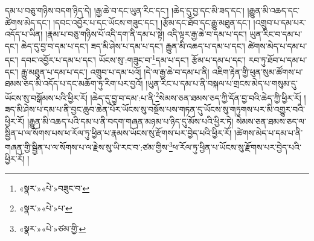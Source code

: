 དམ་པ་བཅུ་གཉིས་བདག་ཉིད་དེ། །རྒྱ་ཆེ་བ་དང་ཡུན་རིང་དང་། །ཆེད་དུ་བྱ་དང་མི་ཟད་དང་། །རྒྱུན་མི་འཆད་དང་ཚེགས་མེད་དང་། །དབང་འབྱོར་པ་དང་ཡོངས་གཟུང་དང་། །རྩོམ་དང་ཐོབ་དང་རྒྱུ་མཐུན་དང་། །འགྲུབ་པ་དམ་པར་འདོད་པ་ཡིན། །རྣམ་པ་བཅུ་གཉིས་པོ་འདི་དག་ནི་དམ་པ་སྟེ། འདི་ལྟར་རྒྱ་ཆེ་བ་དམ་པ་དང་། ཡུན་རིང་བ་དམ་པ་དང་། ཆེད་དུ་བྱ་བ་དམ་པ་དང་། ཟད་མི་ཤེས་པ་དམ་པ་དང་། རྒྱུན་མི་འཆད་པ་དམ་པ་དང་། ཚེགས་མེད་པ་དམ་པ་དང་། དབང་འབྱོར་པ་དམ་པ་དང་། ཡོངས་སུ་:གཟུང་བ་\footnote{«སྣར་»«པེ་»བཟུང་བ་}དམ་པ་དང་། རྩོམ་པ་དམ་པ་དང་། རབ་ཏུ་ཐོབ་པ་དམ་པ་དང་། རྒྱུ་མཐུན་པ་དམ་པ་དང་། འགྲུབ་པ་དམ་པའོ། །དེ་ལ་རྒྱ་ཆེ་བ་དམ་པ་ནི། འཇིག་རྟེན་གྱི་ཕུན་སུམ་ཚོགས་པ་ཐམས་ཅད་མི་འདོད་པ་དང་མཆོག་ཏུ་རིག་པར་བྱའོ། །ཡུན་རིང་པ་དམ་པ་ནི་བསྐལ་པ་གྲངས་མེད་པ་གསུམ་དུ་ཡོངས་སུ་བསྒོམས་པའི་ཕྱིར་རོ། །ཆེད་དུ་བྱ་བ་དམ་:པ་ནི་\footnote{«སྣར་»«པེ་»པ་}སེམས་ཅན་ཐམས་ཅད་ཀྱི་དོན་བྱ་བའི་ཆེད་ཀྱི་ཕྱིར་རོ། །ཟད་མི་ཤེས་པ་དམ་པ་ནི་བྱང་ཆུབ་ཆེན་པོར་ཡོངས་སུ་བསྔོས་པས་གཏན་དུ་ཡོངས་སུ་གཏུགས་པར་མི་འགྱུར་བའི་ཕྱིར་རོ། །རྒྱུན་མི་འཆད་པའི་དམ་པ་ནི་བདག་གཞན་མཉམ་པ་ཉིད་དུ་མོས་པའི་ཕྱིར་ཏེ། སེམས་ཅན་ཐམས་ཅད་ལ་སྦྱིན་པ་ལ་སོགས་པས་ཕ་རོལ་ཏུ་ཕྱིན་པ་རྣམས་ཡོངས་སུ་རྫོགས་པར་བྱེད་པའི་ཕྱིར་རོ། །ཚེགས་མེད་པ་དམ་པ་ནི་གཞན་གྱི་སྦྱིན་པ་ལ་སོགས་པ་ལ་རྗེས་སུ་ཡི་རང་བ་:ཙམ་གྱིས་\footnote{«སྣར་»«པེ་»ཙམ་གྱི་}ཕ་རོལ་ཏུ་ཕྱིན་པ་ཡོངས་སུ་རྫོགས་པར་བྱེད་པའི་ཕྱིར་རོ། །
